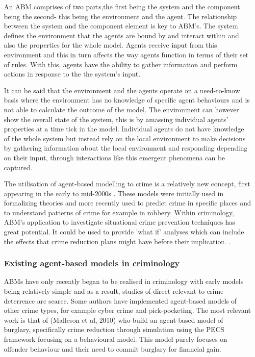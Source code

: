 \documentclass[11pt]{informatics-report}
\begin{document}
An ABM comprises of two parts,the first being the system and the component being the second- this being the environment and the agent. The relationship between the system and the component element is key to ABM's. The system defines the environment that the agents are bound by and interact within and also the properties for the whole model. Agents receive input from this environment and this in turn affects the way agents function in terms of their set of rules. With this, agents have the ability to gather information and perform actions in response to the the system's input. \par

It can be said that the environment and the agents operate on a need-to-know basis where the environment has no knowledge of specific agent behaviours and is not able to calculate the outcome of the model. The environment can however show the overall state of the system, this is by amassing individual agents' properties at a time tick in the model. Individual agents do not have knowledge of the whole system but instead rely on the local environment to make decisions by gathering information about the local environment and responding depending on their input, through interactions like this emergent phenomena can be captured. \par

The utilisation of agent-based modelling to crime is a relatively new concept, first appearing in the early to mid-2000s \cite{groff}. These models were initially used in formalizing theories and more recently used to predict crime in specific places and to understand patterns of crime for example in robbery. Within criminology, ABM's application to investigate situational crime prevention techniques has great potential. It could be used to provide 'what if' analyses which can include the effects that crime reduction plans might have before their implication. \cite{Malleson2014}. 

\subsubsection{Existing agent-based models in criminology}
ABMs have only recently began to be realised in criminology with early models being relatively simple and as a result, studies of direct relevant to crime deterrence are scarce. Some authors have implemented agent-based models of other crime types, for example cyber crime and pick-pocketing. The most relevant work is that of (Malleson et al, 2010)\cite{malleson2010} who build an agent-based model of burglary, specifically crime reduction through simulation using the PECS framework focusing on a behavioural model. This model purely focuses on offender behaviour and their need to commit burglary for financial gain.\par
\end{document}
